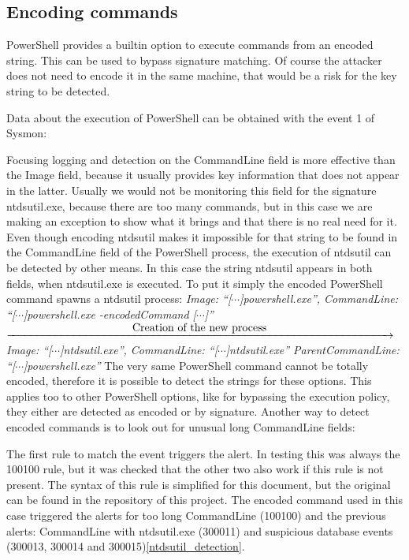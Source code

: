 \subsection{Encoding commands}
PowerShell provides a builtin option to execute commands from an encoded string. This can be used to bypass signature matching. Of course the attacker does not need to encode it in the same machine, that would be a risk for the key string to be detected.
\linej

\linej
Data about the execution of PowerShell can be obtained with the event 1 of Sysmon:

\linej
Focusing logging and detection on the CommandLine field is more effective than the Image field, because it usually provides key information that does not appear in the latter. Usually we would not be monitoring this field for the signature ntdsutil.exe, because there are too many commands, but in this case we are making an exception to show what it brings and that there is no real need for it.
\linej
Even though encoding ntdsutil makes it impossible for that string to be found in the CommandLine field of the PowerShell process, the execution of ntdsutil can be detected by other means. In this case the string ntdsutil appears in both fields, when ntdsutil.exe is executed.
\linej
\linej
\linej
To put it simply the encoded PowerShell command spawns a ntdsutil process:
\linej
\lineh
\textit{Image: ``[$\cdots$]powershell.exe'',
\linej
CommandLine: ``[$\cdots$]powershell.exe -encodedCommand [$\cdots$]''}
\linej
\linej
$\xrightarrow{\makebox[\textwidth]{Creation of the new process}}$
\textit{Image: ``[$\cdots$]ntdsutil.exe'',
\linej
CommandLine: ``[$\cdots$]ntdsutil.exe''
\linej
ParentCommandLine: ``[$\cdots$]powershell.exe''}
\linej
\lineh
\linej
\linej
The very same PowerShell command cannot be totally encoded, therefore it is possible to detect the strings for these options. This applies too to other PowerShell options, like for bypassing the execution policy, they either are detected as encoded or by signature\cite{powershell_adsecurity}.
Another way to detect encoded commands is to look out for unusual long CommandLine fields:

\linej
The first rule to match the event triggers the alert.
In testing this was always the 100100 rule, but it was checked that the other two also work if this rule is not present.
The syntax of this rule is simplified for this document, but the original can be found in the repository of this project\cite{memoria_github}.
\linej
\linej
The encoded command used in this case triggered the alerts for too long CommandLine (100100) and the previous alerts: CommandLine with ntdsutil.exe (300011) and suspicious database events (300013, 300014 and 300015)\ref{ntdsutil_detection}.

